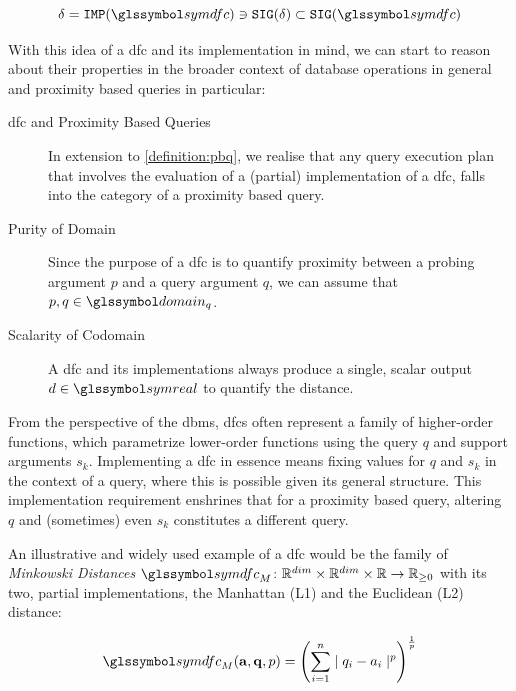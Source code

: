 \begin{equation}
    \label{equation:dfc_implementation}
    \delta = \texttt{IMP}(\symdfc) \ni \texttt{SIG}(\delta) \subset \texttt{SIG}(\symdfc)
\end{equation}

With this idea of a \acrshort{dfc} and its implementation in mind, we can start to reason about their properties in the broader context of database operations in general and proximity based queries in particular:

\begin{description}
    \item[\acrshort{dfc} and Proximity Based Queries] In extension to \cref{definition:pbq}, we realise that any query execution plan that involves the evaluation of a (partial) implementation of a \acrshort{dfc}, falls into the category of a proximity based query.

    \item[Purity of Domain] Since the purpose of a \acrshort{dfc} is to quantify proximity between a probing argument $p$ and a query argument $q$, we can assume that $p, q \in \domain_q$.

    \item[Scalarity of Codomain] A \acrshort{dfc} and its implementations always produce a single, scalar output $d \in \symreal$ to quantify the distance.
\end{description}

From the perspective of the \acrshort{dbms}, \acrshort{dfc}s often represent a family of higher-order functions, which parametrize lower-order functions using the query $q$ and support arguments $s_k$. Implementing a \acrshort{dfc} in essence means fixing values for $q$ and $s_k$ in the context of a query, where this is possible given its general structure. This implementation requirement enshrines that for a proximity based query, altering $q$ and (sometimes) even $s_k$ constitutes a different query. 

An illustrative and widely used example of a \acrshort{dfc} would be the family of \emph{Minkowski Distances} $\symdfc_{M} \colon \mathbb{R}^{dim} \times \mathbb{R}^{dim} \times \mathbb{R} \to \mathbb{R}_{\geq 0}$ with its two, partial implementations, the Manhattan (L1) and the Euclidean (L2) distance:

\begin{equation}
    \symdfc_{M}(\mathbf{a},\mathbf{q},p) = \left(\sum_{i=1}^{n} \mid q_i - a_i \mid^p\right)^{\frac{1}{p}}
\end{equation}

